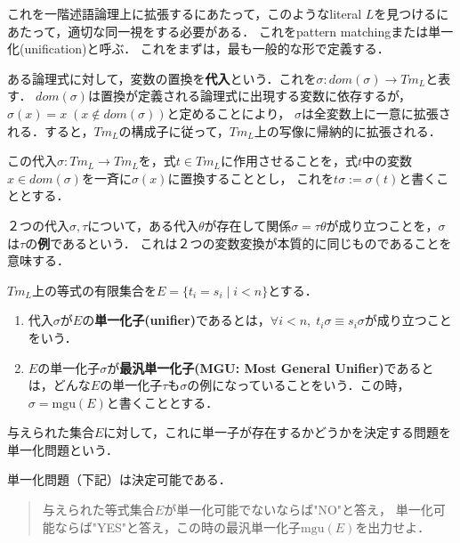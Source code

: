 \documentclass[uplatex, 12pt, dvipdfmx]{jsreport}
\begin{document}
これを一階述語論理上に拡張するにあたって，このようなliteral $L$を見つけるにあたって，適切な同一視をする必要がある．
これをpattern matchingまたは単一化(unification)と呼ぶ．
これをまずは，最も一般的な形で定義する．

\begin{definition}[substitution]
    ある論理式に対して，変数の置換を\textbf{代入}という．これを$\sigma:dom(\sigma)\to Tm_L$と表す．
    $dom(\sigma)$は置換が定義される論理式に出現する変数に依存するが，$\sigma(x)=x\;(x\notin dom(\sigma))$と定めることにより，
    $\sigma$は全変数上に一意に拡張される．すると，$Tm_L$の構成子に従って，$Tm_L$上の写像に帰納的に拡張される．

    この代入$\sigma:Tm_L\to Tm_L$を，式$t\in Tm_L$に作用させることを，式$t$中の変数$x\in dom(\sigma)$を一斉に$\sigma(x)$に置換することとし，
    これを$t\sigma:=\sigma(t)$と書くこととする．
\end{definition}

\begin{definition}[instance]
    ２つの代入$\sigma,\tau$について，ある代入$\theta$が存在して関係$\sigma=\tau\theta$が成り立つことを，$\sigma$は$\tau$の\textbf{例}であるという．
    これは２つの変数変換が本質的に同じものであることを意味する．
\end{definition}

\begin{definition}[unifier]
    $Tm_L$上の等式の有限集合を$E=\{t_i=s_i\mid i<n\}$とする．
    \begin{enumerate}
        \item 代入$\sigma$が$E$の\textbf{単一化子(unifier)}であるとは，$\forall i<n,\; t_i\sigma\equiv s_i\sigma$が成り立つことをいう．
        \item $E$の単一化子$\sigma$が\textbf{最汎単一化子(MGU: Most General Unifier)}であるとは，どんな$E$の単一化子$\tau$も$\sigma$の例になっていることをいう．この時，$\sigma=\mathrm{mgu}(E)$と書くこととする．
    \end{enumerate}
    与えられた集合$E$に対して，これに単一子が存在するかどうかを決定する問題を単一化問題という．
\end{definition}

\begin{theorem}
    単一化問題（下記）は決定可能である．
    \begin{quote}
        与えられた等式集合$E$が単一化可能でないならば"NO"と答え，
        単一化可能ならば"YES"と答え，この時の最汎単一化子$\mathrm{mgu}(E)$を出力せよ．
    \end{quote}
\end{theorem}
\end{document}
